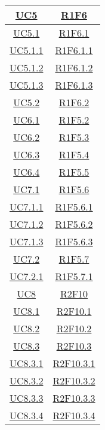 \begin{longtable}{|c|c|}
	\hyperlink{UC5}{UC5} & \hyperlink{R1F6}{R1F6}\\
	\hline
	\hyperlink{UC5.1}{UC5.1} & \hyperlink{R1F6.1}{R1F6.1}\\
	\hline
	\hyperlink{UC5.1.1}{UC5.1.1} & \hyperlink{R1F6.1.1}{R1F6.1.1}\\
	\hline
	\hyperlink{UC5.1.2}{UC5.1.2} & \hyperlink{R1F6.1.2}{R1F6.1.2}\\
	\hline
	\hyperlink{UC5.1.3}{UC5.1.3} & \hyperlink{R1F6.1.3}{R1F6.1.3}\\
	\hline
	\hyperlink{UC5.2}{UC5.2} & \hyperlink{R1F6.2}{R1F6.2}\\
	\hline
	\hyperlink{UC6.1}{UC6.1} & \hyperlink{R1F5.2}{R1F5.2}\\
	\hline
	\hyperlink{UC6.2}{UC6.2} & \hyperlink{R1F5.3}{R1F5.3}\\
	\hline
	\hyperlink{UC6.3}{UC6.3} & \hyperlink{R1F5.4}{R1F5.4}\\
	\hline
	\hyperlink{UC6.4}{UC6.4} & \hyperlink{R1F5.5}{R1F5.5}\\
	\hline
	\hyperlink{UC7.1}{UC7.1} & \hyperlink{R1F5.6}{R1F5.6}\\
	\hline
	\hyperlink{UC7.1.1}{UC7.1.1} & \hyperlink{R1F5.6.1}{R1F5.6.1}\\
	\hline
	\hyperlink{UC7.1.2}{UC7.1.2} & \hyperlink{R1F5.6.2}{R1F5.6.2}\\
	\hline
	\hyperlink{UC7.1.3}{UC7.1.3} & \hyperlink{R1F5.6.3}{R1F5.6.3}\\
	\hline
	\hyperlink{UC7.2}{UC7.2} & \hyperlink{R1F5.7}{R1F5.7}\\
	\hline
	\hyperlink{UC7.2.1}{UC7.2.1} & \hyperlink{R1F5.7.1}{R1F5.7.1}\\
	\hline
	\hyperlink{UC8}{UC8} & \hyperlink{R2F10}{R2F10}\\
	\hline
	\hyperlink{UC8.1}{UC8.1} & \hyperlink{R2F10.1}{R2F10.1}\\
	\hline
	\hyperlink{UC8.2}{UC8.2} & \hyperlink{R2F10.2}{R2F10.2}\\
	\hline
	\hyperlink{UC8.3}{UC8.3} & \hyperlink{R2F10.3}{R2F10.3}\\
	\hline
	\hyperlink{UC8.3.1}{UC8.3.1} & \hyperlink{R2F10.3.1}{R2F10.3.1}\\
	\hline
	\hyperlink{UC8.3.2}{UC8.3.2} & \hyperlink{R2F10.3.2}{R2F10.3.2}\\
	\hline
	\hyperlink{UC8.3.3}{UC8.3.3} & \hyperlink{R2F10.3.3}{R2F10.3.3}\\
	\hline
	\hyperlink{UC8.3.4}{UC8.3.4} & \hyperlink{R2F10.3.4}{R2F10.3.4}\\

\end{longtable}

